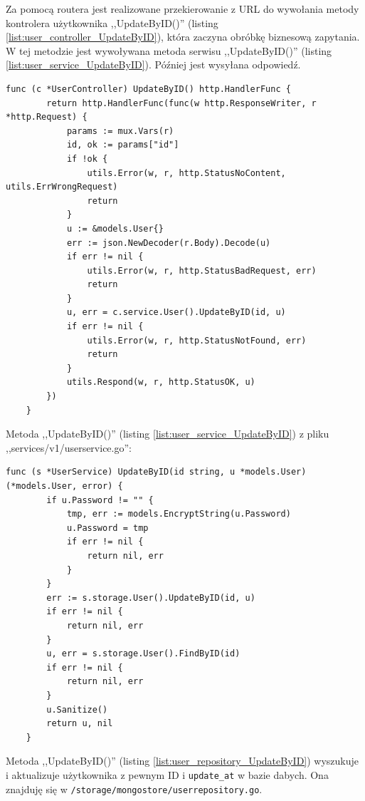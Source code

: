 Za pomocą routera jest realizowane przekierowanie z URL do wywołania metody kontrolera użytkownika ,,UpdateByID()'' (listing \ref{list:user_controller_UpdateByID}), która zaczyna obróbkę biznesową zapytania.
W tej metodzie jest wywoływana metoda serwisu ,,UpdateByID()'' (listing \ref{list:user_service_UpdateByID}). Później jest wysyłana odpowiedź.
\begin{lstlisting}[label=list:user_controller_UpdateByID,caption=Kontroler edycji użytkownika,basicstyle=\tiny\ttfamily]
    func (c *UserController) UpdateByID() http.HandlerFunc {
        return http.HandlerFunc(func(w http.ResponseWriter, r *http.Request) {
            params := mux.Vars(r)
            id, ok := params["id"]
            if !ok {
                utils.Error(w, r, http.StatusNoContent, utils.ErrWrongRequest)
                return
            }
            u := &models.User{}
            err := json.NewDecoder(r.Body).Decode(u)
            if err != nil {
                utils.Error(w, r, http.StatusBadRequest, err)
                return
            }
            u, err = c.service.User().UpdateByID(id, u)
            if err != nil {
                utils.Error(w, r, http.StatusNotFound, err)
                return
            }
            utils.Respond(w, r, http.StatusOK, u)
        })
    }
\end{lstlisting}
Metoda ,,UpdateByID()'' (listing \ref{list:user_service_UpdateByID}) z pliku ,,services/v1/userservice.go'':
\begin{lstlisting}[label=list:user_service_UpdateByID,caption=Serwis edycji użytkownika,basicstyle=\tiny\ttfamily]
    func (s *UserService) UpdateByID(id string, u *models.User) (*models.User, error) {
        if u.Password != "" {
            tmp, err := models.EncryptString(u.Password)
            u.Password = tmp
            if err != nil {
                return nil, err
            }
        }
        err := s.storage.User().UpdateByID(id, u)
        if err != nil {
            return nil, err
        }
        u, err = s.storage.User().FindByID(id)
        if err != nil {
            return nil, err
        }
        u.Sanitize()
        return u, nil
    }
\end{lstlisting}
Metoda ,,UpdateByID()'' (listing \ref{list:user_repository_UpdateByID}) wyszukuje i aktualizuje użytkownika z pewnym ID i \texttt{update\_at} w bazie dabych.
Ona znajduję się w \texttt{/storage/mongostore/userrepository.go}.
